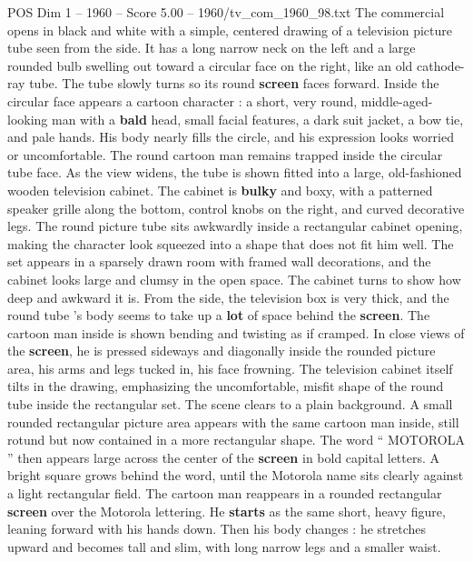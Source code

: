 \begin{textsample}{POS Dim 1 – 1960 – Score 5.00 – 1960/tv\_com\_1960\_98.txt}  \label{ex:f1_pos_076}
The commercial opens in black and white with a simple, centered drawing of a television picture tube seen from the side.
It has a long narrow neck on the left and a large rounded bulb swelling out toward a circular face on the right, like an old cathode-ray tube.
The tube slowly turns so its round \textbf{screen} faces forward.
Inside the circular face appears a cartoon character : a short, very round, middle-aged-looking man with a \textbf{bald} head, small facial features, a dark suit jacket, a bow tie, and pale hands.
His body nearly fills the circle, and his expression looks worried or uncomfortable.
The round cartoon man remains trapped inside the circular tube face.
As the view widens, the tube is shown fitted into a large, old-fashioned wooden television cabinet.
The cabinet is \textbf{bulky} and boxy, with a patterned speaker grille along the bottom, control knobs on the right, and curved decorative legs.
The round picture tube sits awkwardly inside a rectangular cabinet opening, making the character look squeezed into a shape that does not fit him well.
The set appears in a sparsely drawn room with framed wall decorations, and the cabinet looks large and clumsy in the open space.
The cabinet turns to show how deep and awkward it is.
From the side, the television box is very thick, and the round tube ’s body seems to take up a \textbf{lot} of space behind the \textbf{screen}.
The cartoon man inside is shown bending and twisting as if cramped.
In close views of the \textbf{screen}, he is pressed sideways and diagonally inside the rounded picture area, his arms and legs tucked in, his face frowning.
The television cabinet itself tilts in the drawing, emphasizing the uncomfortable, misfit shape of the round tube inside the rectangular set.
The scene clears to a plain background.
A small rounded rectangular picture area appears with the same cartoon man inside, still rotund but now contained in a more rectangular shape.
The word “ MOTOROLA ” then appears large across the center of the \textbf{screen} in bold capital letters.
A bright square grows behind the word, until the Motorola name sits clearly against a light rectangular field.
The cartoon man reappears in a rounded rectangular \textbf{screen} over the Motorola lettering.
He \textbf{starts} as the same short, heavy figure, leaning forward with his hands down.
Then his body changes : he stretches upward and becomes tall and slim, with long narrow legs and a smaller waist.

\end{textsample}
